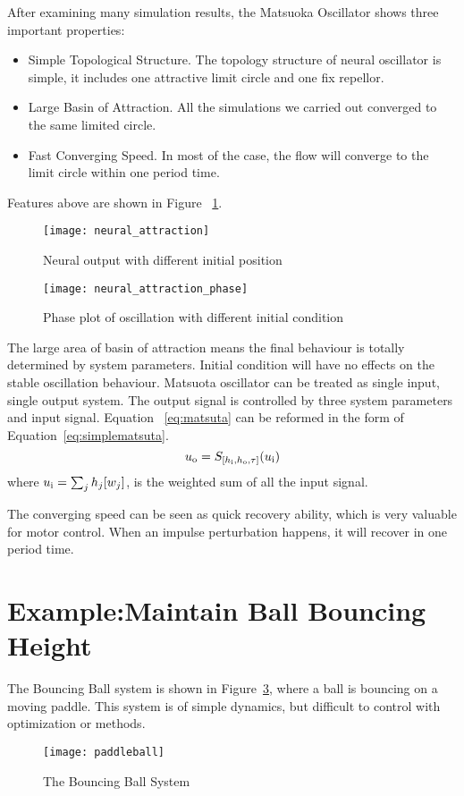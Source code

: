 After examining many simulation results, the Matsuoka Oscillator shows three important properties:
\begin{itemize}
\item{Simple Topological Structure.}
The topology structure of neural oscillator is simple, 
it includes one  attractive limit circle and one fix repellor.
\item{Large Basin of Attraction.}
All the simulations we carried out converged to the same limited circle.
\item{Fast Converging Speed.}
In most of the case, the flow will converge to the limit circle within one period time.
\end{itemize}


Features above are shown in Figure ~\ref{fig:time_timeAttraction}.
\begin{figure}
\begin{center}
\texttt{[image: neural\_attraction]}
\end{center}
\caption{Neural output with different initial position}
\label{fig:time_timeAttraction}
\end{figure}

\begin{figure}
\begin{center}
\texttt{[image: neural\_attraction\_phase]}
\end{center}
\caption{Phase plot of oscillation with different initial condition}
\label{fig:phase_attraction}
\end{figure}
 
The large area of basin of attraction means the final behaviour is totally determined by system parameters. 
Initial condition will have no effects on the stable oscillation behaviour. 
Matsuota oscillator can be treated as single input, single output system.
The output signal is controlled by three system parameters and input signal. 
Equation ~\ref{eq:matsuta} can be reformed in the form of Equation~\ref{eq:simplematsuta}.
\begin{equation}
u_{\mathrm{o}}=S_{[h_{\mathrm{i}},h_{\mathrm{o}},\tau]}(u_{\mathrm{i}})
\label{eq:simplematsuta}
\end{equation}
where $u_{\mathrm{i}}=\sum_{j}h_{j}[w_{j}]$, is the weighted sum of all the input signal.

The converging speed can be seen as quick recovery ability, which is very valuable for motor control.
When an impulse perturbation happens, it will recover in one period time.


\section{Example:Maintain Ball Bouncing Height}
\label{sec:qualyexample}
The Bouncing Ball system is shown in Figure~\ref{fig:bball}, where a ball is bouncing on a moving paddle.
This system is of simple dynamics, but difficult to control with optimization or \pd methods.
\begin{figure}
\begin{center}
\texttt{[image: paddleball]}
\end{center}
\caption{The Bouncing Ball System}
\label{fig:bball}
\end{figure}
 
